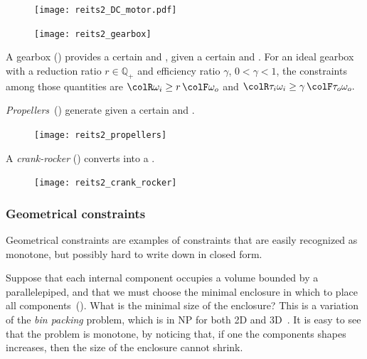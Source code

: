 \begin{figure}[h]
    \centering
     
    \texttt{[image: reits2\_DC\_motor.pdf]}
\caption{\label{fig:dc_motor}}
\end{figure}


\begin{figure}[h]
    \centering
    \texttt{[image: reits2\_gearbox]}
    \caption{ \label{fig:gearbox}}
\end{figure}

\begin{example}
A gearbox () provides a certain  and , given a certain
 and . For
an ideal gearbox with a reduction ratio $r \in \mathbb{ℚ}_+$ and
efficiency ratio $\gamma$, $0<\gamma<1$, the constraints among
those quantities are ${\colR \omega_i}\geq r\,{\colF \omega_o}$
and ${\colR \tau_i\omega_i}\geq\gamma\,{\colF \tau_o\omega_o}.$
\end{example}


\begin{example}
\emph{Propellers}~() generate 
given a certain  and .
\end{example}

\begin{figure}[h!]
    \centering
    \texttt{[image: reits2\_propellers]}
\caption{} \label{fig:propeller}
\end{figure}

\begin{example}
A \emph{crank-rocker} () converts  into a .
\end{example}

\begin{figure}[h!] 
    \centering
    \texttt{[image: reits2\_crank\_rocker]}
    \caption{
        \label{fig:crack}}
    \end{figure}

\subsubsection{Geometrical constraints}

Geometrical constraints are examples of constraints that are easily
recognized as monotone, but possibly hard to write down in closed
form.

\begin{example}
Suppose that each internal component occupies a volume
bounded by a parallelepiped, and that we must choose the minimal enclosure
in which to place all components~(). What
is the minimal size of the enclosure? This is a variation of the \emph{bin
packing} problem, which is in NP for both 2D and 3D~\cite{lodi02two}.
It is easy to see that the problem is monotone, by noticing that,
if one the components shapes increases, then the size of the enclosure
cannot shrink.
\end{example}

